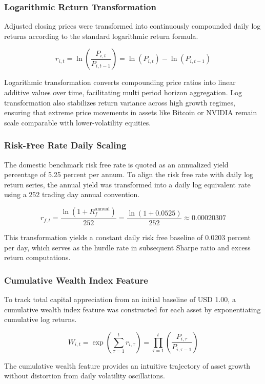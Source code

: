 \subsubsection{Logarithmic Return Transformation}

Adjusted closing prices were transformed into continuously compounded daily log returns according to the standard logarithmic return formula.

\begin{equation}
  r_{i,t} = \ln\left(\frac{P_{i,t}}{P_{i,t-1}}\right) = \ln(P_{i,t}) - \ln(P_{i,t-1})
\end{equation}

Logarithmic transformation converts compounding price ratios into linear additive values over time, facilitating multi period horizon aggregation. Log transformation also stabilizes return variance across high growth regimes, ensuring that extreme price movements in assets like Bitcoin or NVIDIA remain scale comparable with lower-volatility equities.

\subsubsection{Risk-Free Rate Daily Scaling}

The domestic benchmark risk free rate is quoted as an annualized yield percentage of 5.25 percent per annum. To align the risk free rate with daily log return series, the annual yield was transformed into a daily log equivalent rate using a 252 trading day annual convention.

\begin{equation}
  r_{f,t} = \frac{\ln(1 + R_f^{\text{annual}})}{252} = \frac{\ln(1 + 0.0525)}{252} \approx 0.00020307
\end{equation}

This transformation yields a constant daily risk free baseline of 0.0203 percent per day, which serves as the hurdle rate in subsequent Sharpe ratio and excess return computations.

\subsubsection{Cumulative Wealth Index Feature}

To track total capital appreciation from an initial baseline of USD 1.00, a cumulative wealth index feature was constructed for each asset by exponentiating cumulative log returns.

\begin{equation}
  W_{i,t} = \exp\left( \sum_{\tau=1}^{t} r_{i,\tau} \right) = \prod_{\tau=1}^{t} \left( \frac{P_{i,\tau}}{P_{i,\tau-1}} \right)
\end{equation}

The cumulative wealth feature provides an intuitive trajectory of asset growth without distortion from daily volatility oscillations.
